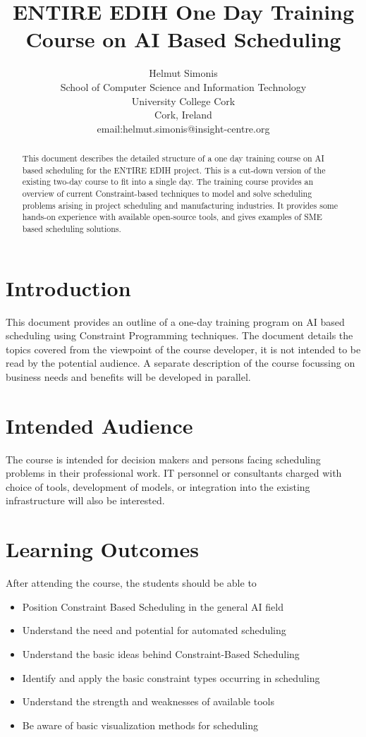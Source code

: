 \documentclass[a4paper]{article}
\title{ENTIRE EDIH One Day Training Course on AI Based Scheduling}
\author{Helmut Simonis\\School of Computer Science and Information Technology\\University College Cork\\Cork, Ireland\\email:helmut.simonis@insight-centre.org}
\begin{document}
\maketitle
\begin{abstract}
This document describes the detailed structure of a one day training course on AI based scheduling for the ENTIRE EDIH project. This is a cut-down version of the existing two-day course to fit into a single day. The training course provides an overview of current Constraint-based techniques to model and solve scheduling problems arising in project scheduling and manufacturing industries. It provides some hands-on experience with available open-source tools, and gives examples of SME based scheduling solutions.
\end{abstract}
\section{Introduction}
\label{sec:introduction}

This document provides an outline of a one-day training program on AI based scheduling using Constraint Programming techniques. The document details the topics covered from the viewpoint of the course developer, it is not intended to be read by the potential audience. A separate description of the course focussing on business needs and benefits will be developed in parallel. 

\section{Intended Audience}
\label{sec:audience}

The course is intended for decision makers and persons facing scheduling problems in their professional work. IT personnel or consultants charged with choice of tools, development of models, or integration into the existing infrastructure will also be interested.

\section{Learning Outcomes}
\label{sec:outcomes}

After attending the course, the students should be able to

\begin{itemize}
\item Position Constraint Based Scheduling in the general AI field
\item Understand the need and potential for automated scheduling
\item Understand the basic ideas behind Constraint-Based Scheduling
\item Identify and apply the basic constraint types occurring in scheduling
\item Understand the strength and weaknesses of available tools
\item Be aware of basic visualization methods for scheduling
\end{itemize}
\end{document}
